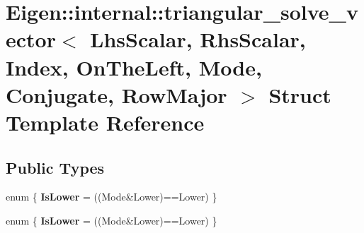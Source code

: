 \hypertarget{struct_eigen_1_1internal_1_1triangular__solve__vector_3_01_lhs_scalar_00_01_rhs_scalar_00_01_ind05791747bf7342daa3286389f182e45b}{}\section{Eigen\+:\+:internal\+:\+:triangular\+\_\+solve\+\_\+vector$<$ Lhs\+Scalar, Rhs\+Scalar, Index, On\+The\+Left, Mode, Conjugate, Row\+Major $>$ Struct Template Reference}
\label{struct_eigen_1_1internal_1_1triangular__solve__vector_3_01_lhs_scalar_00_01_rhs_scalar_00_01_ind05791747bf7342daa3286389f182e45b}
\subsection*{Public Types}
\begin{DoxyCompactItemize}
\item 
\mbox{\label{struct_eigen_1_1internal_1_1triangular__solve__vector_3_01_lhs_scalar_00_01_rhs_scalar_00_01_ind05791747bf7342daa3286389f182e45b_a14ea09ed0d2113c201e4be6ff24b9247}} 
enum \{ {\bfseries Is\+Lower} = ((Mode\&Lower)==Lower)
 \}
\item 
\mbox{\label{struct_eigen_1_1internal_1_1triangular__solve__vector_3_01_lhs_scalar_00_01_rhs_scalar_00_01_ind05791747bf7342daa3286389f182e45b_a65d540c8ea0cd2352e7dfd816e34070b}} 
enum \{ {\bfseries Is\+Lower} = ((Mode\&Lower)==Lower)
 \}
\end{DoxyCompactItemize}
